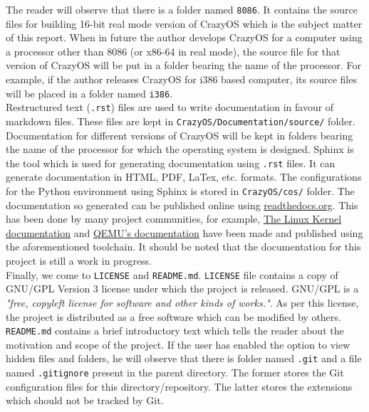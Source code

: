 The reader will observe that there is a folder named \verb|8086|. It contains the source files for building 16-bit real mode version of CrazyOS which is the subject matter of this report. When in future the author develops CrazyOS for a computer using a processor other than 8086 (or x86-64 in real mode), the source file for that version of CrazyOS will be put in a folder bearing the name of the processor. For example, if the author releases CrazyOS for i386 based computer, its source files will be placed in a folder named \verb|i386|.\\
Restructured text (\verb|.rst|) files are used to write documentation in favour of markdown files. These files are kept in \verb|CrazyOS/Documentation/source/| folder. Documentation for different versions of CrazyOS will be kept in folders bearing the name of the processor for which the operating system is designed. Sphinx is the tool which is used for generating documentation using \verb|.rst| files. It can generate documentation in HTML, PDF, LaTex, etc. formats. The configurations for the Python environment using Sphinx is stored in \verb|CrazyOS/cos/| folder. The documentation so generated can be published online using \href{https://readthedocs.org/}{readthedocs.org}. This has been done by many project communities, for example, \href{https://docs.kernel.org/}{The Linux Kernel documentation} and \href{https://www.qemu.org/docs/master/}{QEMU's documentation} have been made and published using the aforementioned toolchain. It should be noted that the documentation for this project is still a work in progress.\\
Finally, we come to \texttt{LICENSE} and \texttt{README.md}. \texttt{LICENSE} file contains a copy of GNU/GPL Version 3 license under which the project is released. GNU/GPL is a \textit{"free, copyleft license for software and other kinds of works."}. As per this license, the project is distributed as a free software which can be modified by others. \texttt{README.md} contains a brief introductory text which tells the reader about the motivation and scope of the project. If the user has enabled the option to view hidden files and folders, he will observe that there is folder named \verb|.git| and a file named \verb|.gitignore| present in the parent directory. The former stores the Git configuration files for this directory/repository. The latter stores the extensions which should not be tracked by Git.\\

